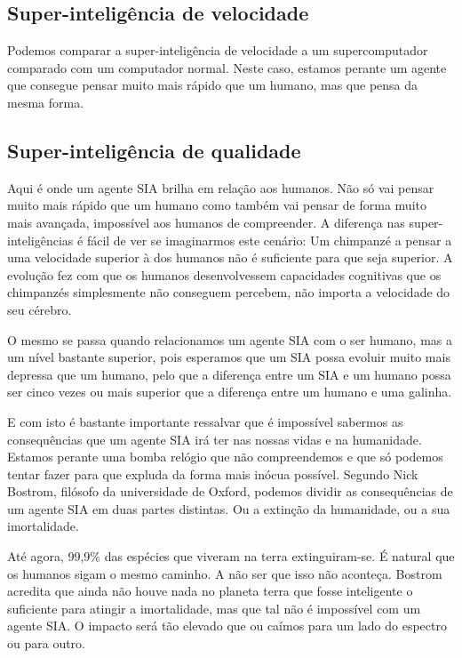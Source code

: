 \documentclass[runningheads,a4paper]{llncs}
\begin{document}
\subsection{Super-inteligência de velocidade}

Podemos comparar a super-inteligência de velocidade a um supercomputador comparado com um computador normal. Neste caso, estamos perante um agente que consegue pensar muito mais rápido que um humano, mas que pensa da mesma forma.

\subsection{Super-inteligência de qualidade}

Aqui é onde um agente SIA brilha em relação aos humanos. Não só vai pensar muito mais rápido que um humano como também vai pensar de forma muito mais avançada, impossível aos humanos de compreender. A diferença nas super-inteligências é fácil de ver se imaginarmos este cenário: Um chimpanzé a pensar a uma velocidade superior à dos humanos não é suficiente para que seja superior. A evolução fez com que os humanos desenvolvessem capacidades cognitivas que os chimpanzés simplesmente não conseguem percebem, não importa a velocidade do seu cérebro.

O mesmo se passa quando relacionamos um agente SIA com o ser humano, mas a um nível bastante superior, pois esperamos que um SIA possa evoluir muito mais depressa que um humano, pelo que a diferença entre um SIA e um humano possa ser cinco vezes ou mais superior que a diferença entre um humano e uma galinha.

E com isto é bastante importante ressalvar que é impossível sabermos as consequências que um agente SIA irá ter nas nossas vidas e na humanidade. Estamos perante uma bomba relógio que não compreendemos e que só podemos tentar fazer para que expluda da forma mais inócua possível. Segundo Nick Bostrom, filósofo da universidade de Oxford, podemos dividir as consequências de um agente SIA em duas partes distintas. Ou a extinção da humanidade, ou a sua imortalidade.

Até agora, 99,9\% das espécies que viveram na terra extinguiram-se. É natural que os humanos sigam o mesmo caminho. A não ser que isso não aconteça. Bostrom acredita que ainda não houve nada no planeta terra que fosse inteligente o suficiente para atingir a imortalidade, mas que tal não é impossível com um agente SIA\@. O impacto será tão elevado que ou caímos para um lado do espectro ou para outro.
\end{document}
